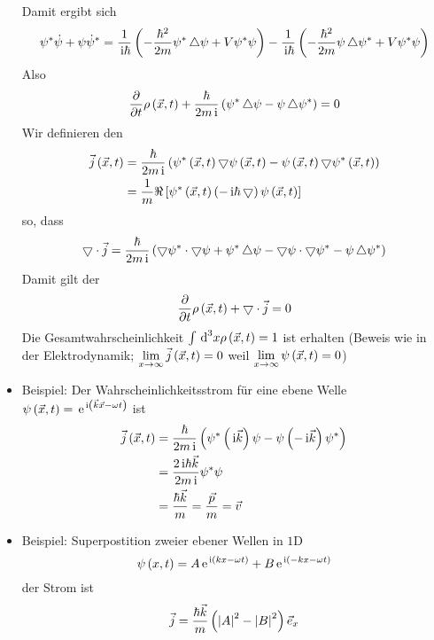 \begin{itemize}
\begin{equation}
	\end{equation}
	Damit ergibt sich
	\begin{equation}
		\psi^*\dot{\psi} + \psi\dot{\psi}^* = \frac{1}{\mI\hbar}\norBra{-\frac{\hbar^2}{2m}\psi^*\Laplace\psi + V \psi^*\psi} - \frac{1}{\mI\hbar}\norBra{-\frac{\hbar^2}{2 m} \psi\Laplace\psi^* + V\psi^*\psi}
	\end{equation}
	Also
	\begin{equation}
		\ppv{}{t} \rho\of{\vX,t} + \frac{\hbar}{2m\mI}\norBra{\psi^*\Laplace\psi - \psi\Laplace\psi^*} = 0
	\end{equation}
	Wir definieren den 
	\begin{align}
		\vJ\of{\vX,t} & = \frac{\hbar}{2 m \mI}\norBra{\psi^*\of{\vX,t} \Nabla\psi\of{\vX,t} - \psi\of{\vX,t}\Nabla\psi^*\of{\vX,t}} \\
		& = \frac{1}{m} \Re \edgBra{\psi^*\of{\vX,t}\norBra{-\mI\hbar\Nabla}\psi\of{\vX,t}}
	\end{align}
	so, dass
	\begin{equation}
		\Nabla\cdot\vJ = \frac{\hbar}{2 m \mI} \norBra{\Nabla\psi^*\cdot\Nabla\psi + \psi^*\Laplace\psi - \Nabla\psi\cdot\Nabla\psi^* - \psi\Laplace\psi^*}
	\end{equation}
	Damit gilt der 
	\begin{equation}
		\ppv{}{t}\rho\of{\vX,t} + \Nabla\cdot\vJ = 0
	\end{equation}
	Die Gesamtwahrscheinlichkeit $\int\dn{x}{3}\rho\of{\vX,t} = 1$ ist erhalten (Beweis wie in der Elektrodynamik; $\lim\limits_{x\to\infty}\vJ\of{\vX,t} = 0$ weil $\lim\limits_{x\to\infty} \psi\of{\vX,t} = 0$)
	\item Beispiel: Der Wahrscheinlichkeitsstrom für eine ebene Welle $\psi\of{\vX,t} = \e{\mI\norBra{\vK\vX - \omega t}}$ ist
	\begin{align}
		\vJ\of{\vX,t} & = \frac{\hbar}{2m\mI} \norBra{\psi^*\norBra{\mI\vK}\psi - \psi\norBra{-\mI\vK}\psi^*} \\
		& = \frac{2 \mI\hbar \vK}{2 m\mI} \psi^*\psi \\
		& = \frac{\hbar\vK}{m} = \frac{\vP}{m} = \vV
	\end{align}
	\item Beispiel: Superpostition zweier ebener Wellen in $1$D
	\begin{equation}
		\psi\of{x,t} = A\e{\mI\norBra{kx-\omega t}} + B\e{\mI\norBra{-kx-\omega t}}
	\end{equation}
	der Strom ist
	\begin{equation}
		\vJ = \frac{\hbar\vK}{m}\norBra{\Norm{A}^2-\Norm{B}^2}\vUn_x
	\end{equation}
\end{itemize}

